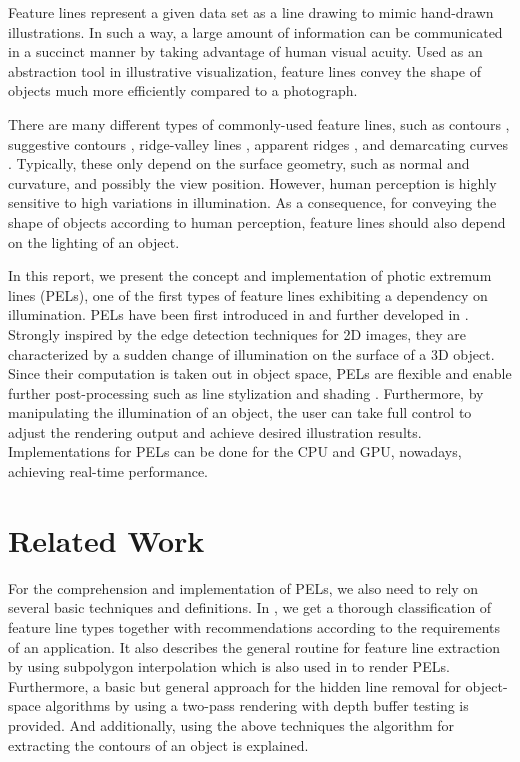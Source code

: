 \documentclass[9pt,fleqn,twoside,twocolumn]{stdglobal}
\begin{document}
  Feature lines represent a given data set as a line drawing to mimic hand-drawn illustrations.
  In such a way, a large amount of information can be communicated in a succinct manner by taking advantage of human visual acuity.
  Used as an abstraction tool in illustrative visualization, feature lines convey the shape of objects much more efficiently compared to a photograph.
  \autocite{xie2007,isenberg2003,viola2005}

  There are many different types of commonly-used feature lines, such as contours \autocite{isenberg2003}, suggestive contours \autocite{decarlo2003}, ridge-valley lines \autocite{ohtake2004}, apparent ridges \autocite{judd2007}, and demarcating curves \autocite{kolomenkin2008}.
  Typically, these only depend on the surface geometry, such as normal and curvature, and possibly the view position.
  However, human perception is highly sensitive to high variations in illumination.
  As a consequence, for conveying the shape of objects according to human perception, feature lines should also depend on the lighting of an object.
  \autocite{xie2007,zhang2011}

  In this report, we present the concept and implementation of photic extremum lines (PELs), one of the first types of feature lines exhibiting a dependency on illumination.
  PELs have been first introduced in \textcite{xie2007} and further developed in \textcite{zhang2010}.
  Strongly inspired by the edge detection techniques for 2D images, they are characterized by a sudden change of illumination on the surface of a 3D object.
  Since their computation is taken out in object space, PELs are flexible and enable further post-processing such as line stylization and shading \autocite{isenberg2003}.
  Furthermore, by manipulating the illumination of an object, the user can take full control to adjust the rendering output and achieve desired illustration results.
  Implementations for PELs can be done for the CPU and GPU, nowadays, achieving real-time performance.
  \autocite{xie2007,zhang2010}

\section{Related Work}
\label{sec:related-work}

  For the comprehension and implementation of PELs, we also need to rely on several basic techniques and definitions.
  In \textcite{isenberg2003}, we get a thorough classification of feature line types together with recommendations according to the requirements of an application.
  It also describes the general routine for feature line extraction by using subpolygon interpolation which is also used in \textcite{zhang2010} to render PELs.
  Furthermore, a basic but general approach for the hidden line removal for object-space algorithms by using a two-pass rendering with depth buffer testing is provided.
  And additionally, using the above techniques the algorithm for extracting the contours of an object is explained.
  \autocite{isenberg2003}
\end{document}
